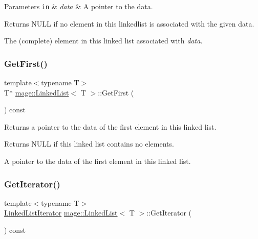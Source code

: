 \begin{DoxyParams}[1]{Parameters}
\mbox{\tt in}  & {\em data} & A pointer to the data. \\
\hline
\end{DoxyParams}
\begin{DoxyReturn}{Returns}
{\ttfamily N\+U\+LL} if no element in this linkedlist is associated with the given data. 

The (complete) element in this linked list associated with {\itshape data}. 
\end{DoxyReturn}
\hypertarget{classmage_1_1_linked_list_a8394fd1c390b806b9daafdff497b02fb}{}\label{classmage_1_1_linked_list_a8394fd1c390b806b9daafdff497b02fb} 
\subsubsection{\texorpdfstring{Get\+First()}{GetFirst()}}
{\footnotesize\ttfamily template$<$typename T$>$ \\
T$\ast$ \hyperlink{classmage_1_1_linked_list}{mage\+::\+Linked\+List}$<$ T $>$\+::Get\+First (\begin{DoxyParamCaption}{ }\end{DoxyParamCaption}) const}

Returns a pointer to the data of the first element in this linked list.

\begin{DoxyReturn}{Returns}
{\ttfamily N\+U\+LL} if this linked list contains no elements. 

A pointer to the data of the first element in this linked list. 
\end{DoxyReturn}
\hypertarget{classmage_1_1_linked_list_a7e4016d051e44eb5d8a7bde3d193b9e8}{}\label{classmage_1_1_linked_list_a7e4016d051e44eb5d8a7bde3d193b9e8} 
\subsubsection{\texorpdfstring{Get\+Iterator()}{GetIterator()}}
{\footnotesize\ttfamily template$<$typename T$>$ \\
\hyperlink{structmage_1_1_linked_list_1_1_linked_list_iterator}{Linked\+List\+Iterator} \hyperlink{classmage_1_1_linked_list}{mage\+::\+Linked\+List}$<$ T $>$\+::Get\+Iterator (\begin{DoxyParamCaption}{ }\end{DoxyParamCaption}) const}

